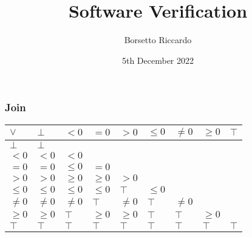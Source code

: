 \documentclass{beamer}
\title{Software Verification}
\author{Borsetto Riccardo}
\institute{Univerisità degli Studi di Padova}
\date{5th December 2022}
\begin{document}
\frame{\titlepage}

\begin{frame}
    \frametitle{Join}
    \begin{table}[]
        \begin{tabular}{|l|l|l|l|l|l|l|l|l|}
        \hline
        $\lor$  & $\bot$  & $<0$    & $=0$    & $>0$    & $\le 0$ & $\ne 0$ & $\ge 0$ & $\top$ \\ \hline
        $\bot$  & $\bot$  &         &         &         &         &         &         &        \\ \hline
        $<0$    & $<0$    & $<0$    &         &         &         &         &         &        \\ \hline
        $=0$    & $=0$    & $\le 0$ & $=0$    &         &         &         &         &        \\ \hline
        $>0$    & $>0$    & $\ge 0$ & $\ge 0$ & $>0$    &         &         &         &        \\ \hline
        $\le 0$ & $\le 0$ & $\le 0$ & $\le 0$ & $\top$  & $\le 0$ &         &         &        \\ \hline
        $\ne 0$ & $\ne 0$ & $\ne 0$ & $\top$  & $\ne 0$ & $\top$  & $\ne 0$ &         &        \\ \hline
        $\ge 0$ & $\ge 0$ & $\top$  & $\ge 0$ & $\ge 0$ & $\top$  & $\top$  & $\ge 0$ &        \\ \hline
        $\top$  & $\top$  & $\top$  & $\top$  & $\top$  & $\top$  & $\top$  & $\top$  & $\top$ \\ \hline
        \end{tabular}
        \end{table}
\end{frame}
\end{document}
